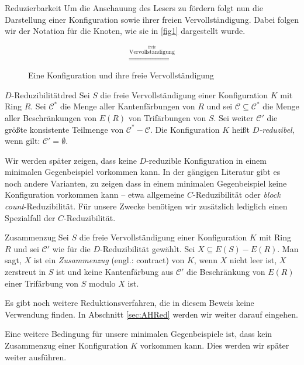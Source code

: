 \begin{section}{Reduzierbarkeit}
 Um die Anschauung des Lesers zu fördern folgt nun die Darstellung einer Konfiguration sowie ihrer freien Vervollständigung. Dabei folgen wir der Notation für die Knoten, wie sie in \ref{fig1} dargestellt wurde.
 
 \begin{figure}[hb]
  \label{fig2}
  \[  \overset{\overset{\text{freie}}{\text{Vervollständigung}}}{\Longrightarrow}  \]
  \caption[Eine Konfiguration und ihre freie Vervollständigung]{Eine Konfiguration und ihre freie Vervollständigung}
 \end{figure}

 
 \begin{definitionl}{$D$-Reduzibilität}{dred}
  Sei $S$ die freie Vervollständigung einer Konfiguration $K$ mit Ring $R$. Sei $\mathscr{C}^*$ die Menge aller Kantenfärbungen von $R$ und sei $\mathscr{C} \subseteq \mathscr{C}^*$ die Menge aller Beschränkungen von $E(R)$ von Trifärbungen von $S$. Sei weiter $\mathscr{C}'$ die größte konsistente Teilmenge von $\mathscr{C}^* - \mathscr{C}$. Die Konfiguration $K$ heißt \textit{$D$-reduzibel}, wenn gilt: $\mathscr{C}' = \emptyset$.
 \end{definitionl}
 
 Wir werden später zeigen, dass keine $D$-reduzible Konfiguration in einem minimalen Gegenbeispiel vorkommen kann. In der gängigen Literatur gibt es noch andere Varianten, zu zeigen dass in einem minimalen Gegenbeispiel keine Konfiguration vorkommen kann -- etwa allgemeine $C$-Reduzibilität oder \textit{block count}-Reduzibilität. Für unsere Zwecke benötigen wir zusätzlich lediglich einen Spezialfall der $C$-Reduzibilität.

 \begin{definition}{Zusammenzug}
  Sei $S$ die freie Vervollständigung einer Konfiguration $K$ mit Ring $R$ und sei $\mathscr{C}'$ wie für die $D$-Reduzibilität gewählt. Sei $X \subseteq E(S) - E(R)$. Man sagt, $X$ ist ein \textit{Zusammenzug} (engl.: contract) von $K$, wenn $X$ nicht leer ist, $X$ zerstreut in $S$ ist und keine Kantenfärbung aus $\mathscr{C}'$ die Beschränkung von $E(R)$ einer Trifärbung von $S$ modulo $X$ ist.
 \end{definition}
 
 Es gibt noch weitere Reduktionsverfahren, die in diesem Beweis keine Verwendung finden. In Abschnitt \ref{sec:AHRed} werden wir weiter darauf eingehen.
 
 Eine weitere Bedingung für unsere minimalen Gegenbeispiele ist, dass kein Zusammenzug einer Konfiguration $K$ vorkommen kann. Dies werden wir später weiter ausführen.
 

\end{section}
